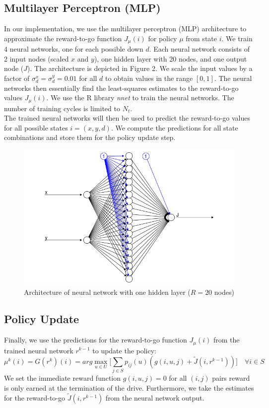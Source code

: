 \documentclass[11pt, oneside]{article}   	%
\begin{document}
\subsection{Multilayer Perceptron (MLP)}
In our implementation, we use the multilayer perceptron (MLP) architecture to approximate the reward-to-go function $J_{\mu}(i)$ for policy $\mu$ from state $i$. We train 4 neural networks, one for each possible down $d$. Each neural network consists of 2 input nodes (scaled $x$ and $y$), one hidden layer with 20 nodes, and one output node ($J$). The architecture is depicted in Figure 2. We scale the input values by a factor of $\sigma_{d}^{x} = \sigma_{d}^{y} = 0.01$ for all $d$ to obtain values in the range $[0,1]$. The neural networks then essentially find the least-squares estimates to the reward-to-go values $J_{\mu}(i)$. We use the R library \textit{nnet} to train the neural networks. The number of training cycles is limited to $N_t$. \\

The trained neural networks will then be used to predict the reward-to-go values for all possible states $i = (x,y,d)$. We compute the predictions for all state combinations and store them for the policy update step.


\begin{figure}[ht!]
\centering
\includegraphics[width=155mm]{../images/neuralnet.png}
\caption{Architecture of neural network with one hidden layer ($R=20$ nodes)}
\end{figure}

\subsection{Policy Update}
Finally, we use the predictions for the reward-to-go function $J_{\mu}(i)$ from the trained neural network $r^{k-1}$ to update the policy:
$$
\mu^{k}(i) = G(r^k)(i) = arg\max\limits_{u \in U} \Big[ \sum\limits_{j \in S} p_{ij}(u)(g(i,u,j) +  \widetilde{J}(i,r^{k-1}))\Big] \quad \forall i \in S
$$
We set the immediate reward function $g(i,u,j) = 0$ for all $(i, j)$ pairs reward is only earned at the termination of the drive. Furthermore, we take the estimates for the reward-to-go $\widetilde{J}(i,r^{k-1})$ from the neural network output.\\
\end{document}
